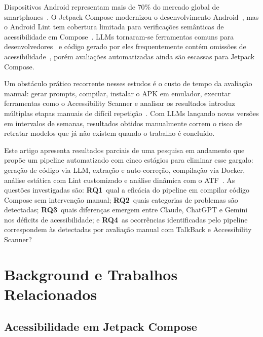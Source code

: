\documentclass[sigconf,review]{webmedia}
\begin{document}
Dispositivos Android representam mais de 70\% do mercado global de
smartphones~\cite{businessofapps2025}. O Jetpack Compose modernizou o
desenvolvimento Android~\cite{google2024compose}, mas o Android Lint tem
cobertura limitada para verificações semânticas de acessibilidade em
Compose~\cite{google2024composeaccessibility}. LLMs tornaram-se ferramentas
comuns para desenvolvedores~\cite{peng2023copilot} e código gerado por eles
frequentemente contém omissões de acessibilidade~\cite{suh2025human,anonref3},
porém avaliações automatizadas ainda são escassas para Jetpack Compose.

Um obstáculo prático recorrente nesses estudos é o custo de tempo da
avaliação manual: gerar prompts, compilar, instalar o APK em emulador,
executar ferramentas como o Accessibility Scanner e analisar os resultados
introduz múltiplas etapas manuais de difícil repetição~\cite{anonref1}. Com LLMs lançando novas versões em intervalos
de semanas, resultados obtidos manualmente correm o risco de retratar modelos
que já não existem quando o trabalho é concluído.

Este artigo apresenta resultados parciais de uma pesquisa em andamento que
propõe um pipeline automatizado com cinco estágios para eliminar esse gargalo:
geração de código via LLM, extração e auto-correção, compilação via Docker,
análise estática com Lint customizado e análise dinâmica com o
ATF~\cite{google2024atf}. As questões investigadas são: \textbf{RQ1}~qual a
eficácia do pipeline em compilar código Compose sem intervenção manual;
\textbf{RQ2}~quais categorias de problemas são detectadas;
\textbf{RQ3}~quais diferenças emergem entre Claude, ChatGPT e Gemini nos
déficits de acessibilidade; e \textbf{RQ4}~as ocorrências identificadas pelo
pipeline correspondem às detectadas por avaliação manual com TalkBack e
Accessibility Scanner?

\section{Background e Trabalhos Relacionados}
\label{sec:background}

\subsection{Acessibilidade em Jetpack Compose}
\end{document}
